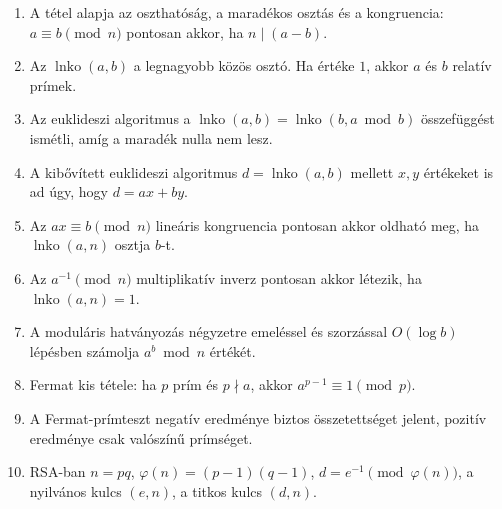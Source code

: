 \begin{enumerate}
  \item A tétel alapja az oszthatóság, a maradékos osztás és a kongruencia: $a\equiv b\pmod n$ pontosan akkor, ha $n\mid(a-b)$.
  \item Az $\operatorname{lnko}(a,b)$ a legnagyobb közös osztó. Ha értéke $1$, akkor $a$ és $b$ relatív prímek.
  \item Az euklideszi algoritmus a $\operatorname{lnko}(a,b)=\operatorname{lnko}(b,a\bmod b)$ összefüggést ismétli, amíg a maradék nulla nem lesz.
  \item A kibővített euklideszi algoritmus $d=\operatorname{lnko}(a,b)$ mellett $x,y$ értékeket is ad úgy, hogy $d=ax+by$.
  \item Az $ax\equiv b\pmod n$ lineáris kongruencia pontosan akkor oldható meg, ha $\operatorname{lnko}(a,n)$ osztja $b$-t.
  \item Az $a^{-1}\pmod n$ multiplikatív inverz pontosan akkor létezik, ha $\operatorname{lnko}(a,n)=1$.
  \item A moduláris hatványozás négyzetre emeléssel és szorzással $O(\log b)$ lépésben számolja $a^b\bmod n$ értékét.
  \item Fermat kis tétele: ha $p$ prím és $p\nmid a$, akkor $a^{p-1}\equiv1\pmod p$.
  \item A Fermat-prímteszt negatív eredménye biztos összetettséget jelent, pozitív eredménye csak valószínű prímséget.
  \item RSA-ban $n=pq$, $\varphi(n)=(p-1)(q-1)$, $d=e^{-1}\pmod{\varphi(n)}$, a nyilvános kulcs $(e,n)$, a titkos kulcs $(d,n)$.
\end{enumerate}
